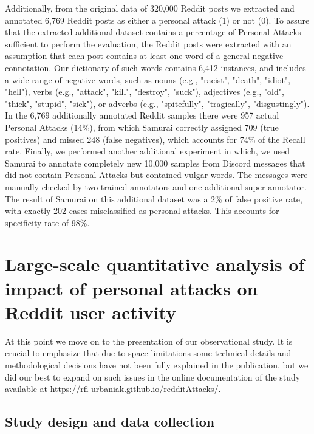 \documentclass[a4paper,fleqn]{cas-dc}
\begin{document}
Additionally, from the original data of 320,000 Reddit posts we extracted and annotated 6,769 Reddit posts as either a personal attack (1) or not (0). To assure that the extracted additional dataset contains a percentage of Personal Attacks sufficient to perform the evaluation, the Reddit posts were extracted with an assumption that each post contains at least one word of a general negative connotation. Our dictionary of such words contains 6,412 instances, and includes a wide range of negative words, such as nouns (e.g., "racist", "death", "idiot", "hell"), verbs (e.g., "attack", "kill", "destroy", "suck"), adjectives (e.g., "old", "thick", "stupid", "sick"), or adverbs (e.g., "spitefully", "tragically", "disgustingly"). In the 6,769 additionally annotated Reddit samples there were 957 actual Personal Attacks (14\%), from which Samurai correctly assigned 709 (true positives) and missed 248 (false negatives), which accounts for 74\% of the Recall rate.
Finally, we performed another additional experiment in which, we used Samurai to annotate completely new 10,000 samples from Discord messages that did not contain Personal Attacks but contained vulgar words. The messages were manually checked by two trained annotators and one additional super-annotator. The result of Samurai on this additional dataset was a 2\% of false positive rate, with exactly 202 cases misclassified as personal attacks. This accounts for specificity rate of 98\%.








\section{Large-scale quantitative analysis of impact of personal attacks on
Reddit user activity}
\label{quantanalysis}


At this point we move on to the presentation of our observational study. It is crucial to emphasize that due to space limitations  some technical details and methodological decisions have not been fully explained in the publication, but we did our best to expand on such issues in the online documentation of the study available at \href{https://rfl-urbaniak.github.io/redditAttacks/}{https://rfl-urbaniak.github.io/redditAttacks/}.


\subsection{Study design and data collection}
\end{document}
